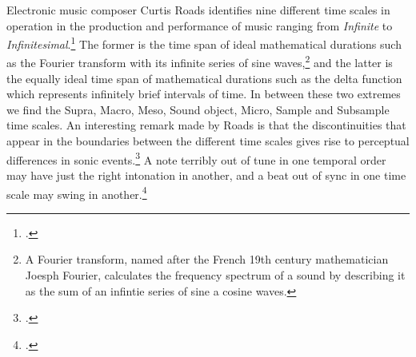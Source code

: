 Electronic music composer Curtis Roads identifies nine different time scales in operation in the production and performance of music ranging from \emph{Infinite} to \emph{Infinitesimal}.\footcite[][ch. 1]{roads} The former is the time span of ideal mathematical durations such as the Fourier transform with its infinite series of sine waves,\footnote{A Fourier transform, named after the French 19th century mathematician Joesph Fourier, calculates the frequency spectrum of a sound by describing it as the sum of an infintie series of sine a cosine waves.} and the latter is the equally ideal time span of mathematical durations such as the delta function which represents infinitely brief intervals of time. In between these two extremes we find the Supra, Macro, Meso, Sound object, Micro, Sample and Subsample time scales. An interesting remark made by Roads is that the discontinuities that appear in the boundaries between the different time scales gives rise to perceptual differences in sonic events.\footcite[4]{roads}  A note terribly out of tune in one temporal order may have just the right intonation in another, and a beat out of sync in one time scale may swing in another.\footcite[For an example of the great variation in rhythmic timing among jazz musicians when observed at high temporal resolution, see][]{friberg02} 

